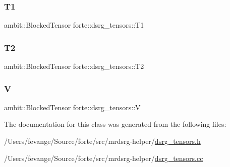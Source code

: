 \mbox{\label{classforte_1_1dsrg__tensors_aeaff2a9b697cb8df97d1e311bfab7636}} 
\subsubsection{\texorpdfstring{T1}{T1}}
{\footnotesize\ttfamily ambit\+::\+Blocked\+Tensor forte\+::dsrg\+\_\+tensors\+::\+T1}

\mbox{\label{classforte_1_1dsrg__tensors_a2808863402de85439422c1113af70a75}} 
\subsubsection{\texorpdfstring{T2}{T2}}
{\footnotesize\ttfamily ambit\+::\+Blocked\+Tensor forte\+::dsrg\+\_\+tensors\+::\+T2}

\mbox{\label{classforte_1_1dsrg__tensors_ad6a2c5c5871706e5030e175407e466c2}} 
\subsubsection{\texorpdfstring{V}{V}}
{\footnotesize\ttfamily ambit\+::\+Blocked\+Tensor forte\+::dsrg\+\_\+tensors\+::V}



The documentation for this class was generated from the following files\+:\begin{DoxyCompactItemize}
\item 
/\+Users/fevange/\+Source/forte/src/mrdsrg-\/helper/\mbox{\hyperlink{dsrg__tensors_8h}{dsrg\+\_\+tensors.\+h}}\item 
/\+Users/fevange/\+Source/forte/src/mrdsrg-\/helper/\mbox{\hyperlink{dsrg__tensors_8cc}{dsrg\+\_\+tensors.\+cc}}\end{DoxyCompactItemize}
